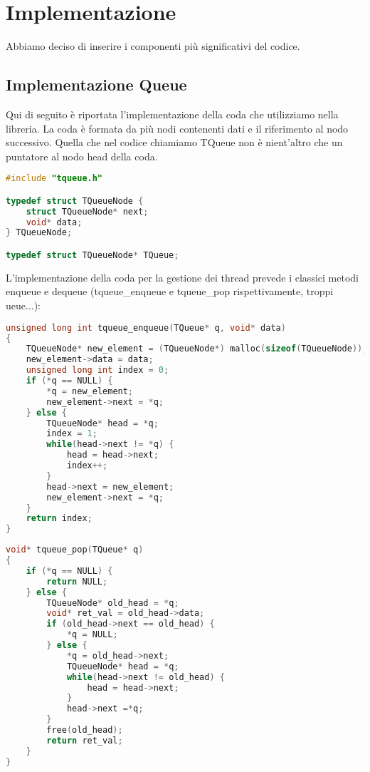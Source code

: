 \documentclass{article}
\begin{document}
\newpage
\section{Implementazione}
\vspace{5mm}

Abbiamo deciso di inserire i componenti più significativi del codice. 

\subsection{Implementazione Queue}
\vspace{2mm}
Qui di seguito è riportata l'implementazione della coda che utilizziamo nella libreria. La coda è formata da più nodi contenenti dati e il riferimento al nodo successivo. Quella che nel codice chiamiamo TQueue non è nient'altro che un puntatore al nodo head della coda.

\begin{lstlisting}[language=C]
#include "tqueue.h"

typedef struct TQueueNode {
    struct TQueueNode* next;
    void* data;
} TQueueNode;

typedef struct TQueueNode* TQueue;

\end{lstlisting}

\noindent L'implementazione della coda per la gestione dei thread prevede i classici metodi enqueue e dequeue (tqueue\_enqueue e tqueue\_pop rispettivamente, troppi ueue...):

\begin{lstlisting}[language=C]
unsigned long int tqueue_enqueue(TQueue* q, void* data)
{
    TQueueNode* new_element = (TQueueNode*) malloc(sizeof(TQueueNode));
    new_element->data = data;
    unsigned long int index = 0;
    if (*q == NULL) {
        *q = new_element;
        new_element->next = *q;
    } else {
        TQueueNode* head = *q;
        index = 1;
        while(head->next != *q) {
            head = head->next;
            index++;
        }
        head->next = new_element;
        new_element->next = *q;
    }
    return index;
}
\end{lstlisting}

\begin{lstlisting}[language=C]
void* tqueue_pop(TQueue* q)
{
    if (*q == NULL) {
        return NULL;
    } else {
        TQueueNode* old_head = *q;
        void* ret_val = old_head->data;
        if (old_head->next == old_head) {
            *q = NULL;
        } else {
            *q = old_head->next;
            TQueueNode* head = *q;
            while(head->next != old_head) {
                head = head->next;
            }
            head->next =*q;
        }
        free(old_head);
        return ret_val;
    }
}
\end{lstlisting}
\end{document}

